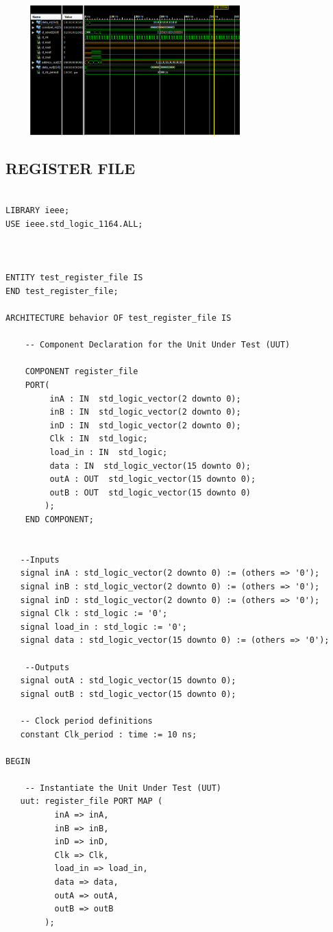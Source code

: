 \documentclass{article}
\begin{document}
\includegraphics[width=10cm, height=5cm]{test_data.png}
\pagebreak

\subsection{REGISTER FILE}\label{sec:result}

\begin{lstlisting}

LIBRARY ieee;
USE ieee.std_logic_1164.ALL;
 

 
ENTITY test_register_file IS
END test_register_file;
 
ARCHITECTURE behavior OF test_register_file IS 
 
    -- Component Declaration for the Unit Under Test (UUT)
 
    COMPONENT register_file
    PORT(
         inA : IN  std_logic_vector(2 downto 0);
         inB : IN  std_logic_vector(2 downto 0);
         inD : IN  std_logic_vector(2 downto 0);
         Clk : IN  std_logic;
         load_in : IN  std_logic;
         data : IN  std_logic_vector(15 downto 0);
         outA : OUT  std_logic_vector(15 downto 0);
         outB : OUT  std_logic_vector(15 downto 0)
        );
    END COMPONENT;
    

   --Inputs
   signal inA : std_logic_vector(2 downto 0) := (others => '0');
   signal inB : std_logic_vector(2 downto 0) := (others => '0');
   signal inD : std_logic_vector(2 downto 0) := (others => '0');
   signal Clk : std_logic := '0';
   signal load_in : std_logic := '0';
   signal data : std_logic_vector(15 downto 0) := (others => '0');

 	--Outputs
   signal outA : std_logic_vector(15 downto 0);
   signal outB : std_logic_vector(15 downto 0);

   -- Clock period definitions
   constant Clk_period : time := 10 ns;
 
BEGIN
 
	-- Instantiate the Unit Under Test (UUT)
   uut: register_file PORT MAP (
          inA => inA,
          inB => inB,
          inD => inD,
          Clk => Clk,
          load_in => load_in,
          data => data,
          outA => outA,
          outB => outB
        );


\end{lstlisting}
\end{document}
